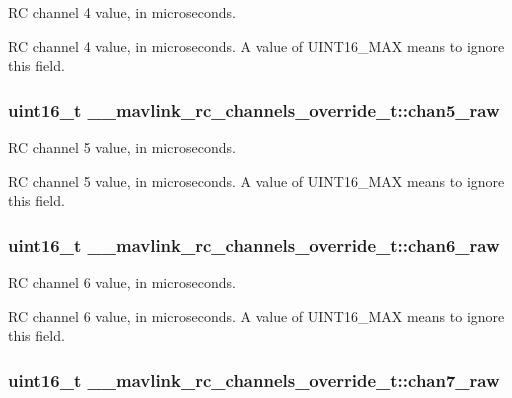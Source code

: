 R\+C channel 4 value, in microseconds. 

R\+C channel 4 value, in microseconds. A value of U\+I\+N\+T16\+\_\+\+M\+A\+X means to ignore this field. \hypertarget{struct____mavlink__rc__channels__override__t_a97c62336395d208d02837ca92085f3ac}{
\subsubsection[{chan5\+\_\+raw}]{\setlength{\rightskip}{0pt plus 5cm}uint16\+\_\+t \+\_\+\+\_\+mavlink\+\_\+rc\+\_\+channels\+\_\+override\+\_\+t\+::chan5\+\_\+raw}}\label{struct____mavlink__rc__channels__override__t_a97c62336395d208d02837ca92085f3ac}


R\+C channel 5 value, in microseconds. 

R\+C channel 5 value, in microseconds. A value of U\+I\+N\+T16\+\_\+\+M\+A\+X means to ignore this field. \hypertarget{struct____mavlink__rc__channels__override__t_a8bef6b7819abe782e905da536c34b11d}{
\subsubsection[{chan6\+\_\+raw}]{\setlength{\rightskip}{0pt plus 5cm}uint16\+\_\+t \+\_\+\+\_\+mavlink\+\_\+rc\+\_\+channels\+\_\+override\+\_\+t\+::chan6\+\_\+raw}}\label{struct____mavlink__rc__channels__override__t_a8bef6b7819abe782e905da536c34b11d}


R\+C channel 6 value, in microseconds. 

R\+C channel 6 value, in microseconds. A value of U\+I\+N\+T16\+\_\+\+M\+A\+X means to ignore this field. \hypertarget{struct____mavlink__rc__channels__override__t_a0380add4a72cd924a6ac61d1504dad82}{
\subsubsection[{chan7\+\_\+raw}]{\setlength{\rightskip}{0pt plus 5cm}uint16\+\_\+t \+\_\+\+\_\+mavlink\+\_\+rc\+\_\+channels\+\_\+override\+\_\+t\+::chan7\+\_\+raw}}\label{struct____mavlink__rc__channels__override__t_a0380add4a72cd924a6ac61d1504dad82}


